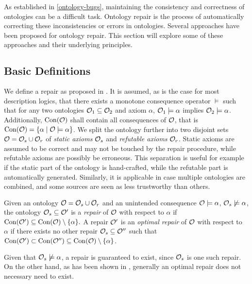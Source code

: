 
As established in \cref{ontology-bugs}, maintaining the consistency and correctness of ontologies can be a difficult task. Ontology repair is the process of automatically correcting these inconsistencies or errors in ontologies. Several approaches have been proposed for ontology repair. This section will explore some of these approaches and their underlying principles.

\subsection{Basic Definitions} \label{basic-definitions}

We define a repair as proposed in \cite{baader2018making}. It is assumed, as is the case for most description logics, that there exists a monotone consequence operator $\models$ such that for any two ontologies $\mathcal{O}_1 \subseteq \mathcal{O}_2$ and axiom $\alpha$, $\mathcal{O}_1 \models \alpha$ implies $\mathcal{O}_2 \models \alpha$. Additionally, $\mathrm{Con}(\mathcal{O})$ shall contain all consequences of $\mathcal{O}$, that is $\mathrm{Con}(\mathcal{O}) = \{ \alpha \mid \mathcal{O} \models \alpha \}$. We split the ontology further into two disjoint sets $\mathcal{O} = \mathcal{O}_s \cup \mathcal{O}_r$ of \emph{static axioms} $\mathcal{O}_s$ and \emph{refutable axioms} $\mathcal{O}_r$. Static axioms are assumed to be correct and may not be touched by the repair procedure, while refutable axioms are possibly be erroneous. This separation is useful for example if the static part of the ontology is hand-crafted, while the refutable part is automatically generated. Similarly, it is applicable in case multiple ontologies are combined, and some sources are seen as less trustworthy than others.

\begin{definition}
  Given an ontology $\mathcal{O} = \mathcal{O}_s \cup \mathcal{O}_r$ and an unintended consequence $\mathcal{O} \models \alpha$, $\mathcal{O}_s \not\models \alpha$, the ontology $\mathcal{O}_s \subseteq \mathcal{O}'$ is a \emph{repair} of $\mathcal{O}$ with respect to $\alpha$ if $\mathrm{Con}(\mathcal{O}') \subseteq \mathrm{Con}(\mathcal{O}) \setminus \{\alpha\}.$ A repair $\mathcal{O}'$ is an \emph{optimal repair} of $\mathcal{O}$ with respect to $\alpha$ if there exists no other repair $\mathcal{O}_s \subseteq \mathcal{O}''$ such that $\mathrm{Con}(\mathcal{O}') \subset \mathrm{Con}(\mathcal{O}'') \subseteq \mathrm{Con}(\mathcal{O}) \setminus \{\alpha\}$.
\end{definition}

Given that $\mathcal{O}_s \not\models \alpha$, a repair is guaranteed to exist, since $\mathcal{O}_s$ is one such repair. On the other hand, as has been shown in \cite{baader2018making}, generally an optimal repair does not necessary need to exist.

